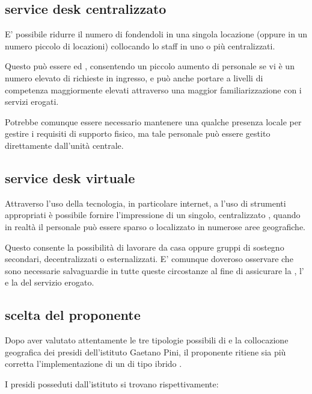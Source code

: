 \subsection[Service Desk Centralizzato]{service desk centralizzato}
\label{sd-centralized-sd}
E' possibile ridurre il numero di  fondendoli in una singola locazione (oppure in un numero piccolo di locazioni) collocando lo staff in uno o più  centralizzati.

Questo può essere  ed , consentendo un piccolo aumento di personale se vi è un numero elevato di richieste in ingresso, e può anche portare a livelli di competenza maggiormente elevati attraverso una maggior familiarizzazione con i servizi erogati.

Potrebbe comunque essere necessario mantenere una qualche presenza locale per gestire i requisiti di supporto fisico, ma tale personale può essere gestito direttamente dall'unità centrale.

\subsection[Service Desk Virtuale]{service desk virtuale}
\label{sd-virtual-sd}
Attraverso l'uso della tecnologia, in particolare internet, a l'uso di strumenti appropriati è possibile fornire l'impressione di un singolo, centralizzato , quando in realtà il personale può essere sparso o localizzato in numerose aree geografiche.

Questo consente la possibilità di lavorare da casa oppure gruppi di sostegno secondari, decentralizzati o esternalizzati. E' comunque doveroso osservare che sono necessarie salvaguardie in tutte queste circostanze al fine di assicurare la , l' e la  del servizio erogato.

\subsection[Scelta del proponente]{scelta del proponente}
Dopo aver valutato attentamente le tre tipologie possibili di  e la collocazione geografica dei presidi dell'istituto Gaetano Pini, il proponente ritiene sia più corretta l'implementazione di un  di tipo ibrido .

I presidi posseduti dall'istituto si trovano rispettivamente:

